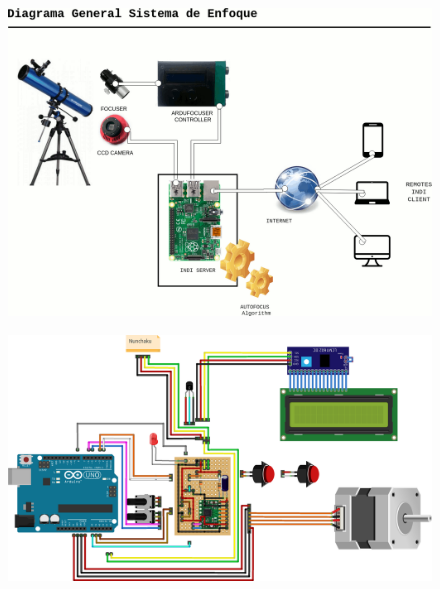 \begin{figure}[h]
	\centering
	\includegraphics[width=0.7\linewidth]{../images/diagramaGeneral}
	\caption{}
	\label{fig:diagramaHardware}
\end{figure}


\begin{figure}[h]
	\centering
	\includegraphics[width=0.7\linewidth]{../images/circuito}
	\caption{}
	\label{fig:diagramaHardware}
\end{figure}


